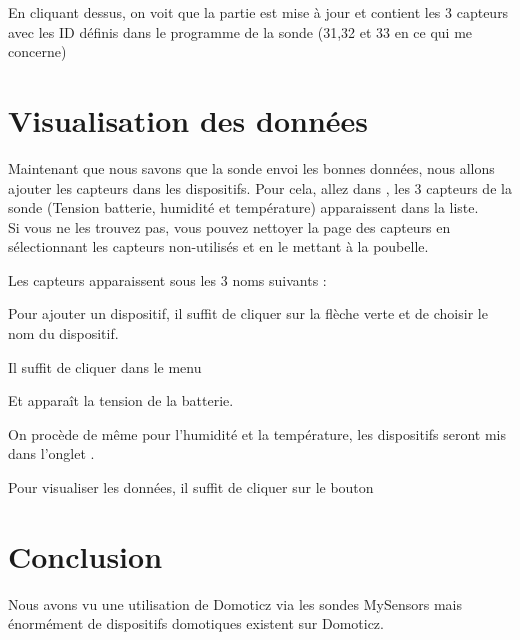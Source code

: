 En cliquant dessus, on voit que la partie  est mise à jour et contient les 3 capteurs avec les ID définis dans le programme de la sonde (31,32 et 33 en ce qui me concerne)



\section{Visualisation des données}

Maintenant que nous savons que la sonde envoi les bonnes données, nous allons ajouter les capteurs dans les dispositifs.
Pour cela, allez dans , les 3 capteurs de la sonde (Tension batterie, humidité et température) apparaissent dans la liste.\\
Si vous ne les trouvez pas, vous pouvez nettoyer la page des capteurs en sélectionnant les capteurs non-utilisés et en le mettant à la poubelle.


Les capteurs apparaissent sous les 3 noms suivants : 


Pour ajouter un dispositif, il suffit de cliquer sur la flèche verte et de choisir le nom du dispositif.



Il suffit de cliquer dans le menu 


Et apparaît la tension de la batterie.


On procède de même pour l'humidité et la température, les dispositifs seront mis dans l'onglet  .



Pour visualiser les données, il suffit de cliquer sur le bouton 


\section{Conclusion}

Nous avons vu une utilisation de Domoticz via les sondes MySensors mais énormément de dispositifs domotiques existent sur Domoticz.


